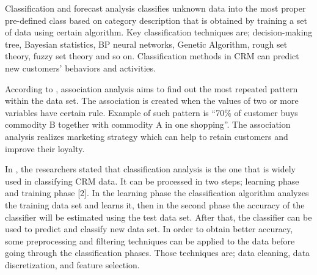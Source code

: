 \documentclass[journal]{IEEEtran}
\begin{document}
\par
Classification and forecast analysis classifies unknown data into the most proper pre-defined class based on category description that is obtained by training a set of data using certain algorithm. Key classification techniques are; decision-making tree, Bayesian statistics, BP neural networks, Genetic Algorithm, rough set theory, fuzzy set theory and so on. Classification methods in CRM can predict new customers’ behaviors and activities.
\par
According to \cite{Ref:ApplicationOfDataMiningInCRM}, association analysis aims to find out the most repeated pattern within the data set. The association is created when the values of two or more variables have certain rule. Example of such pattern is “70\% of customer buys commodity B together with commodity A in one shopping”. The association analysis realizes marketing strategy which can help to retain customers and improve their loyalty.
\par
In \cite{Ref:TargetingCustomers}, the researchers stated that classification analysis is the one that is widely used in classifying CRM data. It can be processed in two steps; learning phase and training phase [2]. In the learning phase the classification algorithm analyzes the training data set and learns it, then in the second phase the accuracy of the classifier will be estimated using the test data set. After that, the classifier can be used to predict and classify new data set. In order to obtain better accuracy, some preprocessing and filtering techniques can be applied to the data before going through the classification phases. Those techniques are; data cleaning, data discretization, and feature selection.
\end{document}
